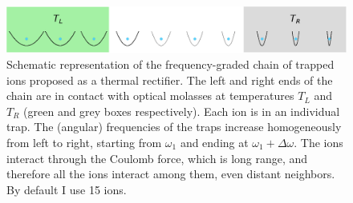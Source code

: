 \begin{figure}
    \center
    \includegraphics[width=0.9\linewidth]{Figures/Diagram.eps}
    \caption{Schematic representation  of the frequency-graded chain of trapped ions proposed as a thermal rectifier. The left and right ends of the chain are in contact with optical molasses at temperatures $T_L$ and $T_R$ (green and grey boxes respectively). Each ion is in an individual trap. The (angular) frequencies of the traps increase homogeneously from left to right, starting from $\omega_1$ and ending at $\omega_1+\Delta\omega$. The ions interact through the Coulomb force, which is long range, and therefore all the ions interact among them, even distant neighbors. By default  I use 15 ions.}
    \label{fig:Diagram}
\end{figure}

